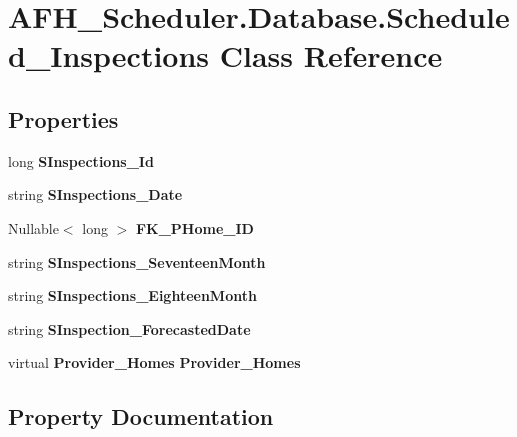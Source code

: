 \section{A\+F\+H\+\_\+\+Scheduler.\+Database.\+Scheduled\+\_\+\+Inspections Class Reference}
\label{class_a_f_h___scheduler_1_1_database_1_1_scheduled___inspections}
\subsection*{Properties}
\begin{DoxyCompactItemize}
\item 
long \textbf{ S\+Inspections\+\_\+\+Id}\hspace{0.3cm}{\ttfamily  [get, set]}
\item 
string \textbf{ S\+Inspections\+\_\+\+Date}\hspace{0.3cm}{\ttfamily  [get, set]}
\item 
Nullable$<$ long $>$ \textbf{ F\+K\+\_\+\+P\+Home\+\_\+\+ID}\hspace{0.3cm}{\ttfamily  [get, set]}
\item 
string \textbf{ S\+Inspections\+\_\+\+Seventeen\+Month}\hspace{0.3cm}{\ttfamily  [get, set]}
\item 
string \textbf{ S\+Inspections\+\_\+\+Eighteen\+Month}\hspace{0.3cm}{\ttfamily  [get, set]}
\item 
string \textbf{ S\+Inspection\+\_\+\+Forecasted\+Date}\hspace{0.3cm}{\ttfamily  [get, set]}
\item 
virtual \textbf{ Provider\+\_\+\+Homes} \textbf{ Provider\+\_\+\+Homes}\hspace{0.3cm}{\ttfamily  [get, set]}
\end{DoxyCompactItemize}


\subsection{Property Documentation}
\mbox{\label{class_a_f_h___scheduler_1_1_database_1_1_scheduled___inspections_acd24cdd1b5ce898a1733aefa90b331d0}} 
